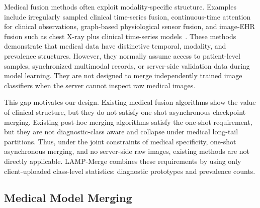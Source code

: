 Medical fusion methods often exploit modality-specific structure. Examples include irregularly sampled clinical time-series fusion, continuous-time attention for clinical observations, graph-based physiological sensor fusion, and image-EHR fusion such as chest X-ray plus clinical time-series models~\cite{shukla2021mtan,zhang2022raindrop,hayat2022medfuse}. These methods demonstrate that medical data have distinctive temporal, modality, and prevalence structures. However, they normally assume access to patient-level samples, synchronized multimodal records, or server-side validation data during model learning. They are not designed to merge independently trained image classifiers when the server cannot inspect raw medical images.

This gap motivates our design. Existing medical fusion algorithms show the value of clinical structure, but they do not satisfy one-shot asynchronous checkpoint merging. Existing post-hoc merging algorithms satisfy the one-shot requirement, but they are not diagnostic-class aware and collapse under medical long-tail partitions. Thus, under the joint constraints of medical specificity, one-shot asynchronous merging, and no server-side raw images, existing methods are not directly applicable. LAMP-Merge combines these requirements by using only client-uploaded class-level statistics: diagnostic prototypes and prevalence counts.

\subsection{Medical Model Merging}

